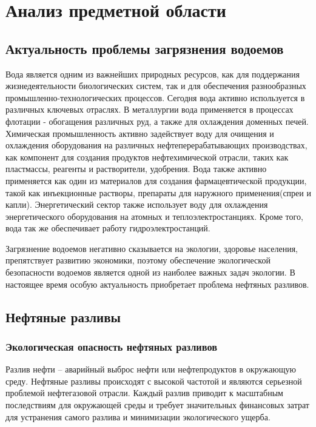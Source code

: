 \section{Анализ предметной области}
\subsection{Актуальность проблемы загрязнения водоемов}

Вода является одним из важнейших природных ресурсов, как для поддержания жизнедеятельности биологических систем, так и для обеспечения разнообразных промышленно-технологических процессов.  Сегодня вода активно используется в различных ключевых отраслях. В металлургии вода применяется в процессах флотации - обогащения различных руд, а также для охлаждения доменных печей. Химическая промышленность активно задействует воду  для очищения и охлаждения оборудования на различных нефтеперерабатывающих производствах, как компонент для создания продуктов нефтехимической отрасли, таких как пластмассы, реагенты и растворители, удобрения. Вода также активно применяется как один из материалов для создания фармацевтической продукции, такой как инъекционные растворы, препараты для наружного применения(спреи и капли).  Энергетический сектор также использует воду для охлаждения энергетического оборудования на атомных и теплоэлектростанциях. Кроме того, вода так же обеспечивает работу гидроэлектростанций. 

 Загрязнение водоемов негативно сказывается на экологии, здоровье населения, препятствует развитию экономики, поэтому обеспечение экологической безопасности водоемов является одной из наиболее важных задач экологии. В настоящее время особую актуальность приобретает проблема нефтяных разливов.
 
\subsection{Нефтяные разливы}

\subsubsection{Экологическая опасность нефтяных разливов}
Разлив нефти -- аварийный выброс нефти или нефтепродуктов в окружающую среду. Нефтяные разливы происходят с высокой частотой и являются серьезной проблемой нефтегазовой отрасли. Каждый разлив приводит к масштабным последствиям для окружающей среды и требует значительных финансовых затрат для устранения самого разлива и минимизации экологического ущерба. 

